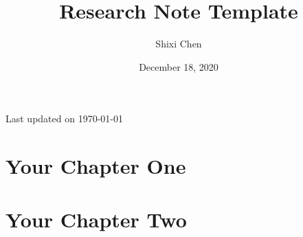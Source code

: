 \documentclass[11pt]{book}
\title{Research Note Template}
\author{Shixi Chen}
\date{December 18, 2020}
\newcommand{\updateinfo}[1][\today]{\par\vfill\hfill{\scriptsize\color{gray}Last updated on #1}}
\begin{document}



{}
\tableofcontents
\updateinfo


\chapter{Your Chapter One}



\chapter{Your Chapter Two}


\end{document}
